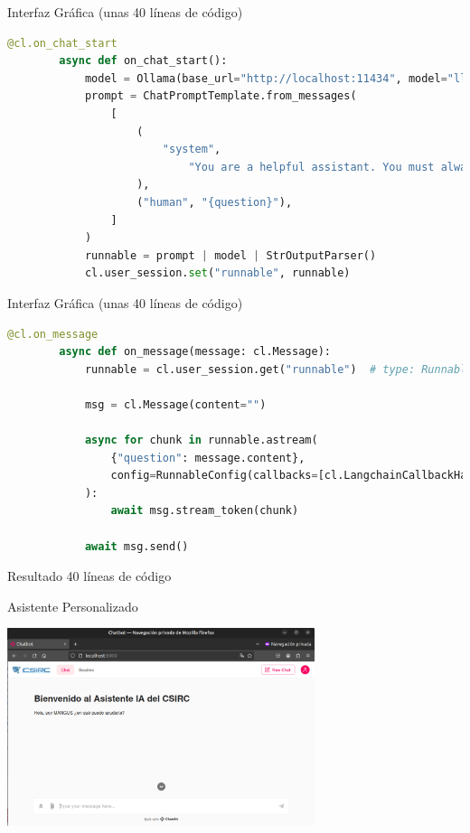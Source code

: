 \documentclass[table, unknownkeysallowed, 10pt]{beamer}
\begin{document}
\begin{frame}[fragile]{Interfaz Gráfica (unas 40 líneas de código)}

    \begin{lstlisting}[language=Python, caption=Código usando el framework Chainlit]
        @cl.on_chat_start
        async def on_chat_start():
            model = Ollama(base_url="http://localhost:11434", model="llama3")
            prompt = ChatPromptTemplate.from_messages(
                [
                    (
                        "system",
                            "You are a helpful assistant. You must always respond to Spanish questions if you receive a question in any other language. "
                    ),
                    ("human", "{question}"),
                ]
            )
            runnable = prompt | model | StrOutputParser()
            cl.user_session.set("runnable", runnable)
    \end{lstlisting}
\end{frame}

\begin{frame}[fragile]{Interfaz Gráfica (unas 40 líneas de código)}
    \begin{lstlisting}[language=Python, caption=Código usando el framework Chainlit]
        @cl.on_message
        async def on_message(message: cl.Message):
            runnable = cl.user_session.get("runnable")  # type: Runnable
        
            msg = cl.Message(content="")
        
            async for chunk in runnable.astream(
                {"question": message.content},
                config=RunnableConfig(callbacks=[cl.LangchainCallbackHandler()]),
            ):
                await msg.stream_token(chunk)
        
            await msg.send()
    \end{lstlisting}
\end{frame}

\begin{frame}{Resultado 40 líneas de código}
    \begin{block}{Asistente Personalizado}
    \begin{center}
        \includegraphics[width=9cm]{imagenes/chainlit.png}
    \end{center}
\end{block}

\end{frame}
\end{document}
